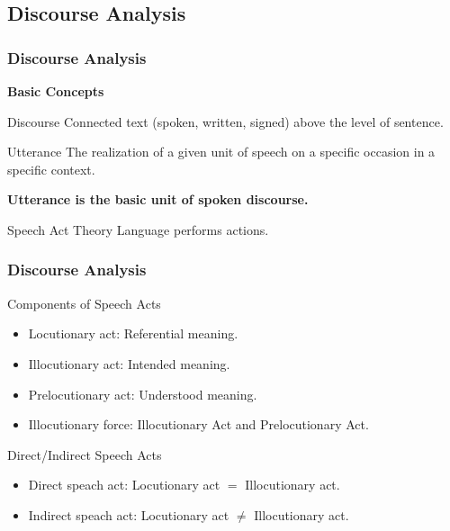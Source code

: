 \documentclass{beamer}
\begin{document}
\subsection{Discourse Analysis}
\begin{frame}
\frametitle{Discourse Analysis}
\textbf{Basic Concepts}
\begin{block}{Discourse}
Connected text (spoken, written, signed) above the level of sentence.
\end{block}

\begin{block}{Utterance}
The realization of a given unit of speech on a specific occasion in a specific context.

\textbf{Utterance is the basic unit of spoken discourse.}
\end{block}

\begin{block}{Speech Act Theory}
Language performs actions.
\end{block}
\end{frame}
\begin{frame}
\frametitle{Discourse Analysis}
\begin{block}{Components of Speech Acts}
\begin{itemize}
\item Locutionary act: Referential meaning.
\item Illocutionary act: Intended meaning.
\item Prelocutionary act: Understood meaning.
\item Illocutionary force: Illocutionary Act and Prelocutionary Act.
\end{itemize}
\end{block}

\begin{block}{Direct/Indirect Speech Acts}
\begin{itemize}
\item Direct speach act: Locutionary act $=$ Illocutionary act.
\item Indirect speach act: Locutionary act $\neq$ Illocutionary act.
\end{itemize}
\end{block}
\end{frame}
\end{document}
